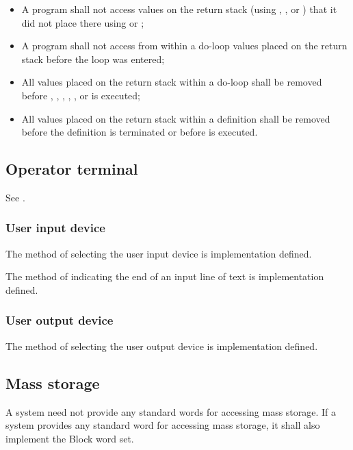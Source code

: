 \begin{itemize}
\item A program shall not access values on the return stack
	(using , ,  or )
	that it did not place there using  or ;

\item A program shall not access from within a do-loop values
	placed on the return stack before the loop was entered;

\item All values placed on the return stack within a do-loop
	shall be removed before , , ,
	, , or  is executed;

\item All values placed on the return stack within a definition
	shall be removed before the definition is terminated or
	before  is executed.
\end{itemize}

\subsection{Operator terminal} %

See .

\subsubsection{User input device} %
\label{usage:input}

The method of selecting the user input device is implementation
defined.

The method of indicating the end of an input line of text is
implementation defined.

\subsubsection{User output device} %
\label{usage:output}

The method of selecting the user output device is implementation
defined.

\subsection{Mass storage} %

A system need not provide any standard words for accessing mass
storage. If a system provides any standard word for accessing
mass storage, it shall also implement the Block word set.


